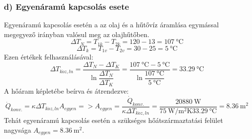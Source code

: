 \subsubsection*{d) Egyenáramú kapcsolás esete }
Egyenáramú kapcsolás esetén a az olaj és a hűtővíz áramlása egymással megegyező irányban valósul meg az olajhűtőben. 
\begin{equation}
\Delta T_N =  T_{1k} - T_{2k} = 120 - 13 =\SI{107}{\celsius}
\end{equation}
\begin{equation}
\Delta T_k =  T_{1v} - T_{2v} = 30 - 25 =\SI{5}{\celsius}
\end{equation}
Ezen értékek felhasználásával:
\begin{equation}
\Delta T_{k\ddot{o}z,ln} 
= 
\dfrac{\Delta T_N - \Delta T_K}{\ln\dfrac{\Delta T_N}{\Delta T_K}} 
= 
\dfrac{\SI{107}{\celsius} - \SI{5}{\celsius}}{\ln\dfrac{\SI{107}{\celsius}}{\SI{5}{\celsius}}} 
= 
\SI{33,29}{\celsius}
\end{equation}
A hőáram képletébe beírva és átrendezve:
\begin{equation}
\dot{Q}_{konv.} = \kappa \Delta T_{k\ddot{o}z,ln} A_{egyen} => A_{egyen} = \dfrac{\dot{Q}_{konv.}}{\kappa \Delta T_{k\ddot{o}z,ln}} = \dfrac{\SI{20880}{\watt}}{\SI{75}{\watt\per\meter\squared\kelvin} \SI{33,29}{\celsius}} = \SI{8,36}{\meter\squared}
\end{equation}
Tehát egyenáramú kapcsolás esetén a szükséges hőátszármaztatási felület nagysága $A_{egyen} = \SI{8,36}{\meter\squared}$.


\pagebreak
